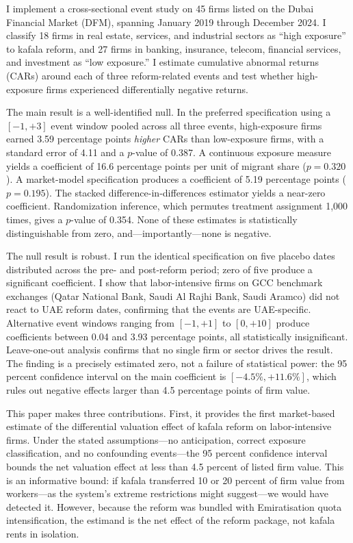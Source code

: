 \documentclass[12pt]{article}
\begin{document}
I implement a cross-sectional event study on 45 firms listed on the Dubai Financial Market (DFM), spanning January 2019 through December 2024. I classify 18 firms in real estate, services, and industrial sectors as ``high exposure'' to kafala reform, and 27 firms in banking, insurance, telecom, financial services, and investment as ``low exposure.'' I estimate cumulative abnormal returns (CARs) around each of three reform-related events and test whether high-exposure firms experienced differentially negative returns.

The main result is a well-identified null. In the preferred specification using a $[-1,+3]$ event window pooled across all three events, high-exposure firms earned 3.59 percentage points \emph{higher} CARs than low-exposure firms, with a standard error of 4.11 and a $p$-value of 0.387. A continuous exposure measure yields a coefficient of 16.6 percentage points per unit of migrant share ($p = 0.320$). A market-model specification produces a coefficient of 5.19 percentage points ($p = 0.195$). The stacked difference-in-differences estimator yields a near-zero coefficient. Randomization inference, which permutes treatment assignment 1,000 times, gives a $p$-value of 0.354. None of these estimates is statistically distinguishable from zero, and---importantly---none is negative.

The null result is robust. I run the identical specification on five placebo dates distributed across the pre- and post-reform period; zero of five produce a significant coefficient. I show that labor-intensive firms on GCC benchmark exchanges (Qatar National Bank, Saudi Al Rajhi Bank, Saudi Aramco) did not react to UAE reform dates, confirming that the events are UAE-specific. Alternative event windows ranging from $[-1,+1]$ to $[0,+10]$ produce coefficients between 0.04 and 3.93 percentage points, all statistically insignificant. Leave-one-out analysis confirms that no single firm or sector drives the result. The finding is a precisely estimated zero, not a failure of statistical power: the 95 percent confidence interval on the main coefficient is $[-4.5\%, +11.6\%]$, which rules out negative effects larger than 4.5 percentage points of firm value.

This paper makes three contributions. First, it provides the first market-based estimate of the differential valuation effect of kafala reform on labor-intensive firms. Under the stated assumptions---no anticipation, correct exposure classification, and no confounding events---the 95 percent confidence interval bounds the net valuation effect at less than 4.5 percent of listed firm value. This is an informative bound: if kafala transferred 10 or 20 percent of firm value from workers---as the system's extreme restrictions might suggest---we would have detected it. However, because the reform was bundled with Emiratisation quota intensification, the estimand is the net effect of the reform package, not kafala rents in isolation.
\end{document}
